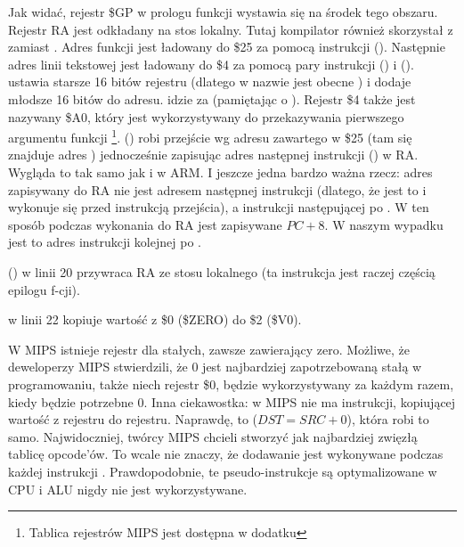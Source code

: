 

Jak widać, rejestr \$GP w prologu funkcji wystawia się na środek tego obszaru.
Rejestr \ac{RA} jest odkładany na stos lokalny.
Tutaj kompilator również skorzystał z \puts zamiast \printf.
Adres funkcji \puts jest ładowany do \$25 za pomocą instrukcji  ().
Następnie adres linii tekstowej jest ładowany do \$4 za pomocą pary instrukcji  () i
 ().
 ustawia starsze 16 bitów rejestru (dlatego w nazwie jest obecne ) i 
dodaje młodsze 16 bitów do adresu.
 idzie za  (pamiętając o ).
Rejestr \$4 także jest nazywany \$A0, który jest wykorzystywany do przekazywania pierwszego argumentu funkcji
\footnote{Tablica rejestrów MIPS jest dostępna w dodatku }.
 () robi przejście wg adresu zawartego w \$25 (tam się znajduje adres \puts) 
jednocześnie zapisując adres następnej instrukcji () w \ac{RA}.
Wygląda to tak samo jak i w ARM.
I jeszcze jedna bardzo ważna rzecz: adres zapisywany do \ac{RA} nie jest adresem następnej instrukcji (dlatego, że jest to
 i wykonuje się przed instrukcją przejścia),
a instrukcji następującej po .
W ten sposób podczas wykonania  do \ac{RA} jest zapisywane $PC + 8$.
W naszym wypadku jest to adres instrukcji  kolejnej po .

 () w linii 20 przywraca \ac{RA} ze stosu lokalnego (ta instrukcja jest raczej częścią epilogu f-cji).

 w linii 22 kopiuje wartość z \$0 (\$ZERO) do \$2 (\$V0).

\label{MIPS_zero_register}
W MIPS istnieje rejestr dla stałych, zawsze zawierający zero.
Możliwe, że deweloperzy MIPS stwierdzili, że 0 jest najbardziej zapotrzebowaną stałą w programowaniu,
także niech rejestr \$0, będzie wykorzystywany za każdym razem, kiedy będzie potrzebne 0.
Inna ciekawostka: w MIPS nie ma instrukcji, kopiującej wartość z rejestru do rejestru.
Naprawdę,  to  ($DST=SRC+0$), która robi to samo.
Najwidoczniej, twórcy MIPS chcieli stworzyć jak najbardziej zwięzłą tablicę opcode'ów.
To wcale nie znaczy, że dodawanie jest wykonywane podczas każdej instrukcji .
Prawdopodobnie, te pseudo-instrukcje są optymalizowane w \ac{CPU} i \ac{ALU} nigdy nie jest wykorzystywane.

